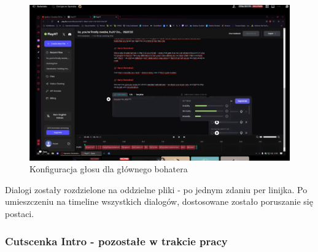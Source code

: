 \begin{figure}[h]
    \centering
    \includegraphics[width=1\linewidth]{Images/voice_hero.PNG}
    \caption{Konfiguracja głosu dla głównego bohatera}
\end{figure}
\FloatBarrier
Dialogi zostały rozdzielone na oddzielne pliki - po jednym zdaniu per linijka.
Po umieszczeniu na timeline wszystkich dialogów, dostosowane zostało poruszanie się postaci.
\subsubsection{Cutscenka Intro - pozostałe w trakcie pracy}

